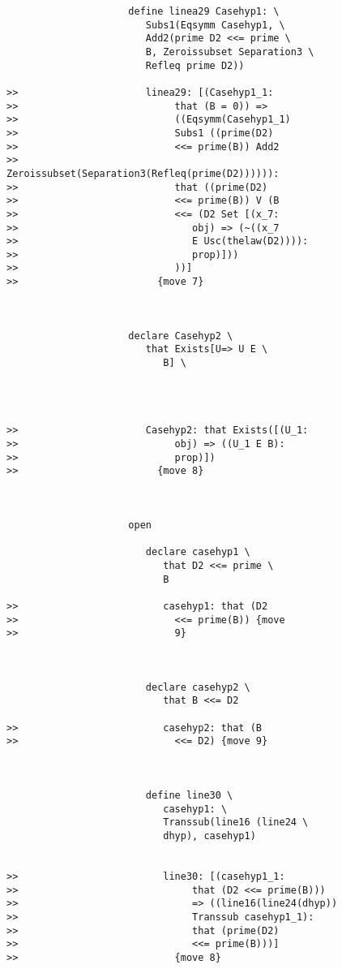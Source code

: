 \documentclass[12pt]{article}
\begin{document}
\begin{verbatim}
                     define linea29 Casehyp1: \
                        Subs1(Eqsymm Casehyp1, \
                        Add2(prime D2 <<= prime \
                        B, Zeroissubset Separation3 \
                        Refleq prime D2))

>>                      linea29: [(Casehyp1_1:
>>                           that (B = 0)) =>
>>                           ((Eqsymm(Casehyp1_1)
>>                           Subs1 ((prime(D2)
>>                           <<= prime(B)) Add2
>>                           Zeroissubset(Separation3(Refleq(prime(D2)))))):
>>                           that ((prime(D2)
>>                           <<= prime(B)) V (B
>>                           <<= (D2 Set [(x_7:
>>                              obj) => (~((x_7
>>                              E Usc(thelaw(D2)))):
>>                              prop)]))
>>                           ))]
>>                        {move 7}



                     declare Casehyp2 \
                        that Exists[U=> U E \
                           B] \
                        



>>                      Casehyp2: that Exists([(U_1:
>>                           obj) => ((U_1 E B):
>>                           prop)])
>>                        {move 8}



                     open

                        declare casehyp1 \
                           that D2 <<= prime \
                           B

>>                         casehyp1: that (D2
>>                           <<= prime(B)) {move
>>                           9}



                        declare casehyp2 \
                           that B <<= D2

>>                         casehyp2: that (B
>>                           <<= D2) {move 9}



                        define line30 \
                           casehyp1: \
                           Transsub(line16 (line24 \
                           dhyp), casehyp1)


>>                         line30: [(casehyp1_1:
>>                              that (D2 <<= prime(B)))
>>                              => ((line16(line24(dhyp))
>>                              Transsub casehyp1_1):
>>                              that (prime(D2)
>>                              <<= prime(B)))]
>>                           {move 8}




\end{verbatim}
\end{document}
